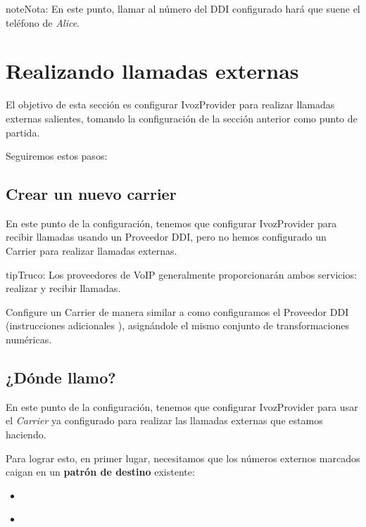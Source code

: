 \documentclass[letterpaper,10pt,spanish]{sphinxmanual}
\begin{document}
\begin{notice}{note}{Nota:}
En este punto, llamar al número del DDI configurado hará que suene el teléfono de \emph{Alice}.
\end{notice}


\chapter{Realizando llamadas externas}
\label{getting_started/external_outgoing_calls/index:making-external-calls}\label{getting_started/external_outgoing_calls/index::doc}
El objetivo de esta sección es configurar IvozProvider para realizar llamadas externas salientes, tomando la configuración de la sección anterior como punto de partida.

Seguiremos estos pasos:


\section{Crear un nuevo carrier}
\label{getting_started/external_outgoing_calls/create_carrier:create-a-new-carrier}\label{getting_started/external_outgoing_calls/create_carrier::doc}
En este punto de la configuración, tenemos que configurar IvozProvider para recibir llamadas usando un Proveedor DDI, pero no hemos configurado un Carrier para realizar llamadas externas.

\begin{notice}{tip}{Truco:}
Los proveedores de VoIP generalmente proporcionarán ambos servicios: realizar y recibir llamadas.
\end{notice}

Configure un Carrier de manera similar a como configuramos el Proveedor DDI (instrucciones adicionales {\hyperref[administration_portal/brand/providers/carriers:carriers]{}}), asignándole el mismo conjunto de transformaciones numéricas.


\section{¿Dónde llamo?}
\label{getting_started/external_outgoing_calls/where_do_i_call::doc}\label{getting_started/external_outgoing_calls/where_do_i_call:where-do-i-call}
En este punto de la configuración, tenemos que configurar IvozProvider para usar el \emph{Carrier} ya configurado para realizar las llamadas externas que estamos haciendo.

Para lograr esto, en primer lugar, necesitamos que los números externos marcados caigan en un \textbf{patrón de destino} existente:
\begin{itemize}
\item {} 
{\hyperref[administration_portal/brand/routing/routing_patterns:id1]{}}

\item {} 
{\hyperref[administration_portal/brand/routing/routing_patterns_groups:routing\string-pattern\string-groups]{}}

\end{itemize}
\end{document}
